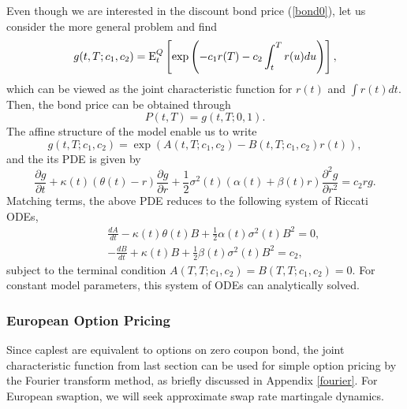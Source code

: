 \documentclass[12pt]{article}
\begin{document}
      Even though we are interested in the discount bond price (\ref{bond0}), let us consider the more general problem
      and find
      \begin{equation}
        g(t,T;c_1,c_2)={\rm E}_t^Q\left[\exp\left(-c_1r(T)-c_2\int_t^Tr(u)du\right)\right],
      \end{equation}
      which can be viewed as the joint characteristic function for $r(t)$ and $\int r(t)dt$. Then, the bond price can be
      obtained through
      \begin{equation}
        P(t,T)=g(t,T;0,1).
      \end{equation}
      The affine structure of the model enable us to write
      \begin{equation}
        g(t,T;c_1,c_2)=\exp\left(A(t,T;c_1, c_2) - B(t,T;c_1, c_2)r(t)\right),
      \end{equation}
      and the its PDE is given by
      \begin{equation}
        \frac{\partial g}{\partial t}+\kappa(t)\left(\theta(t)-r\right)\frac{\partial g}{\partial r}
            +\frac{1}{2}\sigma^2(t)(\alpha(t)+\beta(t) r)\frac{\partial^2g}{\partial r^2} = c_2rg.
      \end{equation}
      Matching terms, the above PDE reduces to the following system of Riccati ODEs,
      \begin{eqnarray}
        &&\frac{dA}{dt}-\kappa(t)\theta(t)B+\frac{1}{2}\alpha(t)\sigma^2(t)B^2=0,\\
        &&-\frac{dB}{dt}+\kappa(t)B+\frac{1}{2}\beta(t)\sigma^2(t)B^2=c_2,
      \end{eqnarray}
      subject to the terminal condition $A(T,T;c_1,c_2)=B(T,T;c_1,c_2)=0$. For constant model parameters, this system of ODEs can
      analytically solved.

    \subsubsection{European Option Pricing}

      Since caplest are equivalent to options on zero coupon bond, the joint characteristic function from last section can be used
      for simple option pricing by the Fourier transform method, as briefly discussed in Appendix \ref{fourier}. For European swaption,
      we will seek approximate swap rate martingale dynamics.
\end{document}

